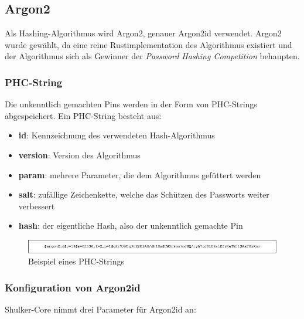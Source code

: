 \subsection{Argon2}
Als Hashing-Algorithmus wird Argon2, genauer Argon2id verwendet. Argon2 wurde gewählt, da eine reine Rustimplementation des Algorithmus
existiert und der Algorithmus sich als Gewinner der \textit{Password Hashing Competition} behaupten.\cite{passwordhashingcmp}

\subsubsection{PHC-String}
Die unkenntlich gemachten Pins werden in der Form von PHC-Strings abgespeichert. Ein PHC-String besteht aus:
\begin{itemize}
    \item \textbf{id}: Kennzeichnung des verwendeten Hash-Algorithmus
    \item \textbf{version}: Version des Algorithmus
    \item \textbf{param}: mehrere Parameter, die dem Algorithmus gefüttert werden
    \item \textbf{salt}: zufällige Zeichenkette, welche das Schützen des Passworts weiter verbessert
    \item \textbf{hash}: der eigentliche Hash, also der unkenntlich gemachte Pin
\end{itemize}
\begin{figure}[H]
    \begin{center}
        \includegraphics[width=1\textwidth]{images/core/phc_string.png}
        \caption{Beispiel eines PHC-Strings}
    \end{center}
\end{figure}
\cite{phcstring}

\subsubsection{Konfiguration von Argon2id}
Shulker-Core nimmt drei Parameter für Argon2id an:


